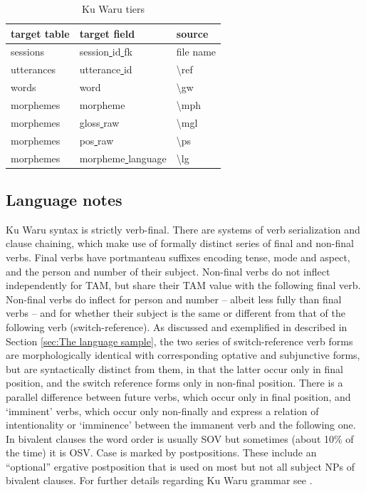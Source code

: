 \documentclass[a4paper, 11pt]{book}
\newcommand{\bks}{\textbackslash}	%
\newcommand{\und}{\underline{{ }}\hspace{0.2mm}}	%
\begin{document}
\begin{table}[ht!]
	\centering
	\begin{tabular}{lll}
		\toprule
			\textbf{target table} & \textbf{target field} & \textbf{source} \\
		\midrule 
			sessions 	& session\und id\und fk & file name \\
			utterances 	& utterance\und id		& \bks ref \\
			words	 	& word			& \bks gw \\
			morphemes	& morpheme				& \bks mph \\ %
			morphemes	& gloss\und raw			& \bks mgl \\ %
			morphemes	& pos\und raw			& \bks ps \\ %
			morphemes	& morpheme\und language	& \bks lg \\
		\bottomrule
	\end{tabular}
	\caption{Ku Waru tiers}
	\label{tab:Ku Waru tiers}
\end{table}
	
\subsection{Language notes}

Ku Waru syntax is strictly verb-final. There are systems of verb serialization and clause chaining, which make use of formally distinct series of final and non-final verbs. Final verbs have portmanteau suffixes encoding tense, mode and aspect, and the person and number of their subject. Non-final verbs do not inflect independently for TAM, but share their TAM value with the following final verb. Non-final verbs do inflect for person and number -- albeit less fully than final verbs -- and for whether their subject is the same or different from that of the following verb (switch-reference). As discussed and exemplified in described in Section \ref{sec:The language sample}, the two series of switch-reference verb forms are morphologically identical with corresponding optative and subjunctive forms, but are syntactically distinct from them, in that the latter occur only in final position, and the switch reference forms only in non-final position. There is a parallel difference between future verbs, which occur only in final position, and ‘imminent’ verbs, which occur only non-finally and express a relation of intentionality or ‘imminence’ between the immanent verb and the following one. In bivalent clauses the word order is usually SOV but sometimes (about 10\% of the time) it is OSV. Case is marked by postpositions. These include an “optional” ergative postposition that is used on most but not all subject NPs of bivalent clauses. For further details regarding Ku Waru grammar see \cite[322--343]{MerlanRumsey1991}. 
\end{document}
